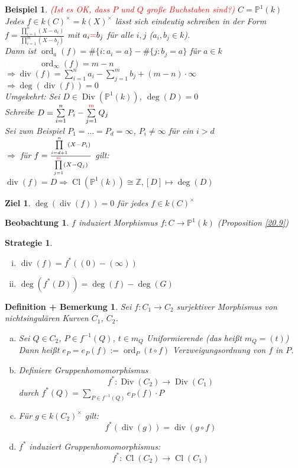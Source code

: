 \documentclass[a4paper,12pt]{report}
\theoremstyle{break}
\newtheorem{DefBem}[Def]{Definition + Bemerkung}
\newtheorem{Bsp}[Def]{Beispiel}
\theoremstyle{nonumberbreak}
\newtheorem{Beo}{Beobachtung}
\newtheorem{Ziel}{Ziel}
\newtheorem{Strat}{Strategie}
\theoremstyle{nonumberplain}
\DeclareMathOperator{\Cl}{Cl}
\DeclareMathOperator{\Div}{Div}
\DeclareMathOperator{\Ddiv}{div}
\DeclareMathOperator{\ord}{ord}
\newcommand{\Z}{\mathbb{Z}}
\newcommand{\IP}{\mathbb{P}}%
\newcommand{\X}{\times}
\begin{document}
\begin{Bsp}\textcolor{red}{(Ist es OK, dass $P$ und $Q$ gro\ss e Buchstaben sind?)}
$C=\IP^1(k)$\\
Jedes $f\in k(C)^\X=k(X)^\X$ l\"asst sich eindeutig schreiben in der Form $f=\frac{\prod\limits_{i=1}^n(X-a_i)}{\prod\limits_{i=1}^m(X-b_j)}$ mit $a_i\textcolor{red}{=}b_j$ f\"ur alle $i,j$ ($a_i,b_j\in k$).\\
Dann ist $\ord_a(f)=\#\{i:a_i=a\}-\#\{j:b_j=a\}$ f\"ur $a\in k$\\
\textcolor{white}{Dann ist} $\ord_\infty(f)=m-n$\\
$\Rightarrow \Ddiv(f)=\sum\limits_{i=1}^na_i-\sum\limits_{j=1}^mb_j+(m-n)\cdot\infty$\\
$\Rightarrow \deg(\Ddiv(f))=0$\\
Umgekehrt: Sei $D\in \Div(\IP^1(k))$, $\deg(D)=0$\\
Schreibe $D=\sum\limits_{i=1}^nP_i-\sum\limits_{j=1}^{\textcolor{red}{m}}Q_j$\\
Sei zum Beispiel $P_1=\ldots =P_d=\infty$, $P_i\ne\infty$ f\"ur ein $i>d$\\
$\Rightarrow$ f\"ur $f=\frac{\prod\limits_{i=d+1}^n(X-P_i)}{\prod\limits_{j=1}^{\textcolor{red}{m}}(X-Q_j)}$ gilt: $\Ddiv(f)=D \Rightarrow \Cl(\IP^1(k))\cong\Z, [D]\mapsto\deg(D)$
\end{Bsp}

\begin{Ziel}
$\deg(\Ddiv(f))=0$ f\"ur jedes $f\in k(C)^\X$
\end{Ziel}

\begin{Beo}
$f$ induziert Morphismus $f:C\to\IP^1(k)$ (Proposition \ref{20.9})
\end{Beo}

\begin{Strat}\begin{enumerate}[i)]
\item
	$\Ddiv(f)=f^*((0)-(\infty))$
\item
	$\deg(f^*(D))=\deg(f)-\deg(G)$
\end{enumerate}\end{Strat}

\begin{DefBem}
Sei $f:C_1\to C_2$ surjektiver Morphismus von nichtsingul\"aren Kurven $C_1$, $C_2$.\begin{enumerate}[a)]
\item
	Sei $Q\in C_2$, $P\in f^{-1}(Q)$, $t\in m_Q$ Uniformierende (das hei\ss t $m_Q=(t)$)\\
	Dann hei\ss t $e_P=e_P(f):=\ord_P(t\circ f)$ Verzweigungsordnung von $f$ in $P$.
\item
	Definiere Gruppenhomomorphismus	
		\[f^*: \Div(C_2) \to \Div(C_1) \]
	durch $f^*(Q)=\sum\limits_{P\in f^{-1}(Q)}e_P(f)\cdot P$
\item
	F\"ur $g\in k(C_2)^\X$ gilt:
		\[ f^*(\Ddiv(g))=\Ddiv(g\circ f) \]
\item
	$f^*$ induziert Gruppenhomomorphismus:
		\[ f^*: \Cl(C_2) \to \Cl(C_1) \]
\end{enumerate}\end{DefBem}
\end{document}
